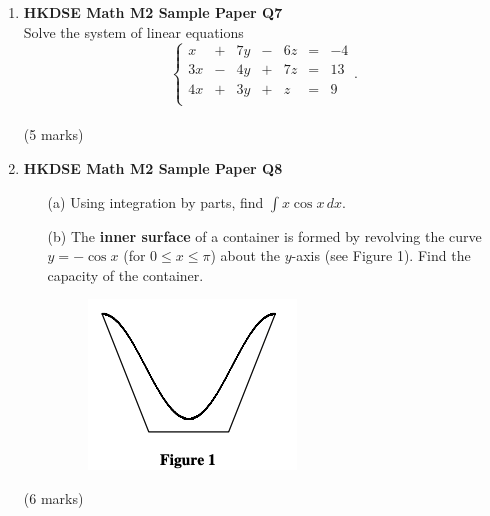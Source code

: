 \documentclass[12pt]{article}
\begin{document}
\begin{enumerate}
	\item \textbf{HKDSE Math M2 Sample Paper Q7}\\
	Solve the system of linear equations
	$$\left\{\begin{matrix}
		x & + & 7y & - & 6z & = & -4\\
		3x & - & 4y & + & 7z & = & 13\\
		4x & + & 3y & + & z & = & 9\\
	\end{matrix}\right..$$ \\(5 marks)

	\item\textbf{HKDSE Math M2 Sample Paper Q8}
	\begin{enumerate}
		\item [(a)]Using integration by parts, find $\displaystyle\int x\cos{x}\,dx$. 
		\item [(b)]The \textbf{inner surface} of a container is formed by revolving the curve $y = -\cos{x}$ (for $0 \leq x \leq \pi$) about the $y$-axis (see Figure 1). Find the capacity of the container. 
		\begin{figure}[H]
			\centering
			\includegraphics[width = .5\linewidth]{SPFigure1}
		\end{figure}
	\end{enumerate}
	(6 marks)



\end{enumerate}
\end{document}
